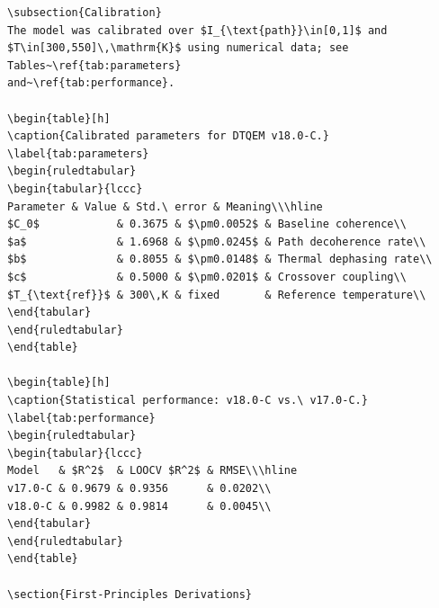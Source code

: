 \documentclass[12pt]{article}
\begin{document}
\begin{Verbatim}[fontsize=\tiny,breaklines=true]
\subsection{Calibration}
The model was calibrated over $I_{\text{path}}\in[0,1]$ and
$T\in[300,550]\,\mathrm{K}$ using numerical data; see Tables~\ref{tab:parameters}
and~\ref{tab:performance}.

\begin{table}[h]
\caption{Calibrated parameters for DTQEM v18.0-C.}
\label{tab:parameters}
\begin{ruledtabular}
\begin{tabular}{lccc}
Parameter & Value & Std.\ error & Meaning\\\hline
$C_0$            & 0.3675 & $\pm0.0052$ & Baseline coherence\\
$a$              & 1.6968 & $\pm0.0245$ & Path decoherence rate\\
$b$              & 0.8055 & $\pm0.0148$ & Thermal dephasing rate\\
$c$              & 0.5000 & $\pm0.0201$ & Crossover coupling\\
$T_{\text{ref}}$ & 300\,K & fixed       & Reference temperature\\
\end{tabular}
\end{ruledtabular}
\end{table}

\begin{table}[h]
\caption{Statistical performance: v18.0-C vs.\ v17.0-C.}
\label{tab:performance}
\begin{ruledtabular}
\begin{tabular}{lccc}
Model   & $R^2$  & LOOCV $R^2$ & RMSE\\\hline
v17.0-C & 0.9679 & 0.9356      & 0.0202\\
v18.0-C & 0.9982 & 0.9814      & 0.0045\\
\end{tabular}
\end{ruledtabular}
\end{table}

\section{First-Principles Derivations}

\end{Verbatim}
\end{document}
